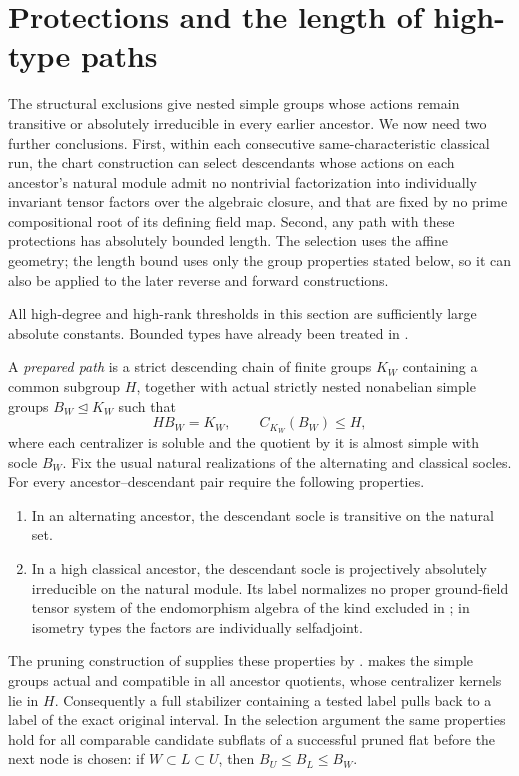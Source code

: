 \section{Protections and the length of high-type paths}\label{sec:weights}

The structural exclusions give nested simple groups whose actions remain
transitive or absolutely irreducible in every earlier ancestor. We now
need two further conclusions. First, within each consecutive
same-characteristic classical run, the chart construction can select
descendants whose actions on each ancestor's natural module admit no
nontrivial factorization into individually invariant tensor factors
over the algebraic closure, and that are fixed by no prime compositional
root of its defining field map. Second, any path with these protections
has absolutely bounded length. The selection uses the affine geometry;
the length bound uses only the group properties stated below, so it can
also be applied to the later reverse and forward constructions.

All high-degree and high-rank thresholds in this section are sufficiently
large absolute constants. Bounded types have already been treated in
.

\begin{definition}\label{w:prepared-path}
A \emph{prepared path} is a strict descending chain of finite groups
$K_W$ containing a common subgroup $H$, together with actual strictly
nested nonabelian simple groups $B_W\trianglelefteq K_W$ such that
\[
 HB_W=K_W,\qquad C_{K_W}(B_W)\le H,
\]
where each centralizer is soluble and the quotient by it is almost
simple with socle $B_W$. Fix the usual natural realizations of the
alternating and classical socles. For every ancestor--descendant pair
require the following properties.
\begin{enumerate}
\item In an alternating ancestor, the descendant socle is transitive on the natural set.
\item In a high classical ancestor, the descendant socle is projectively absolutely irreducible on the natural module. Its label normalizes no proper ground-field tensor system of the endomorphism algebra of the kind excluded in ; in isometry types the factors are individually selfadjoint.
\end{enumerate}
\end{definition}

The pruning construction of  supplies these properties
by .
 makes the simple groups actual and compatible
in all ancestor quotients, whose centralizer kernels lie in $H$.
Consequently a full stabilizer containing a tested label pulls back to
a label of the exact original interval. In the selection argument the
same properties hold for all comparable candidate subflats of a
successful pruned flat before the next node is chosen: if
$W\subset L\subset U$, then $B_U\le B_L\le B_W$.

